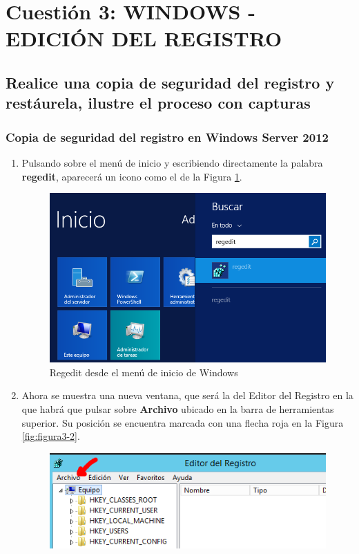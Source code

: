 \section{Cuestión 3: WINDOWS - EDICIÓN DEL REGISTRO}
\subsection{Realice una copia de seguridad del registro y restáurela,
	ilustre el proceso con capturas}

\subsubsection{Copia de seguridad del registro en Windows Server 2012\cite{enlace7}}
	\begin{enumerate}
		\item Pulsando sobre el menú de inicio y escribiendo directamente la palabra \textbf{regedit}, aparecerá un icono como el de la Figura \ref{fig:figura3-1}.
			\begin{figure}[H] %
				\centering
				\includegraphics[scale=0.6]{figuras/ejercicio3/figura3-1.png} 
				\caption{Regedit desde el menú de inicio de Windows} 
				\label{fig:figura3-1}
			\end{figure} 
		\item Ahora se muestra una nueva ventana, que será la del Editor del Registro en la que habrá que pulsar sobre \textbf{Archivo} ubicado en la barra de herramientas superior. Su posición se encuentra marcada con una flecha roja en la Figura \ref{fig:figura3-2}.
			\begin{figure}[H] %
				\centering
				\includegraphics[scale=0.9]{figuras/ejercicio3/figura3-2.png} 

\end{figure}
\end{enumerate}
